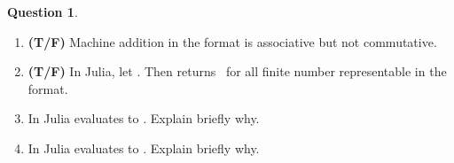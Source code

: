 \documentclass[10pt]{article}
\theoremstyle{definition}
\newtheorem{question}{Question}
\theoremstyle{remark}
\theoremstyle{plain}%
\begin{document}
\begin{question}
\begin{enumerate}
        \item
            \textbf{(T/F)}
            Machine addition in the  format is associative but not commutative.

        \item
            \textbf{(T/F)}
            In Julia, let .
            Then  returns~ for all finite number  representable in the  format.

        \item
            \mymark
             In Julia  evaluates to .
             Explain briefly why.
             \vspace{1.7cm}

        \item
            \mymark
             In Julia  evaluates to .
             Explain briefly why.
             \vspace{1.7cm}
    \end{enumerate}
\end{question}
\end{document}

